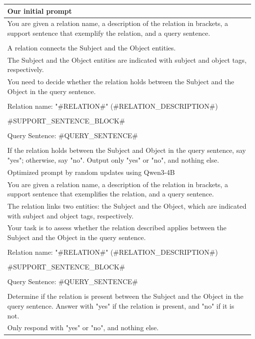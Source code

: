 \documentclass[12pt]{article}
\begin{document}
\begin{table}[h]
\centering
\begin{tabular}{l}
\toprule
\midrule
Our initial prompt\\
\midrule
You are given a relation name, a description of the relation in brackets, a support sentence that exemplify the relation, and a query sentence.\\
\\
A relation connects the Subject and the Object entities. \\
The Subject and the Object entities are indicated with subject and object tags, respectively. \\
You need to decide whether the relation holds between the Subject and the Object in the query sentence.\\
\\
Relation name: "\#RELATION\#" (\#RELATION\_DESCRIPTION\#)\\
\\
\#SUPPORT\_SENTENCE\_BLOCK\#\\
\\
Query Sentence: \#QUERY\_SENTENCE\#\\
\\
If the relation holds between the Subject and Object in the query sentence, say "yes"; otherwise, say "no". Output only "yes" or "no", and nothing else. \\

\midrule
Optimized prompt by random updates using Qwen3-4B\\
\midrule
You are given a relation name, a description of the relation in brackets, a support sentence that exemplifies the relation, and a query sentence. \\
The relation links two entities: the Subject and the Object, which are indicated with subject and object tags, respectively. \\
Your task is to assess whether the relation described applies between the Subject and the Object in the query sentence.\\
\\
Relation name: "\#RELATION\#" (\#RELATION\_DESCRIPTION\#)\\
\\
\#SUPPORT\_SENTENCE\_BLOCK\#\\
\\
Query Sentence: \#QUERY\_SENTENCE\#\\
\\
Determine if the relation is present between the Subject and the Object in the query sentence. Answer with "yes" if the relation is present, and "no" if it is not. \\
Only respond with "yes" or "no", and nothing else. \\


\end{tabular}
\end{table}
\end{document}
